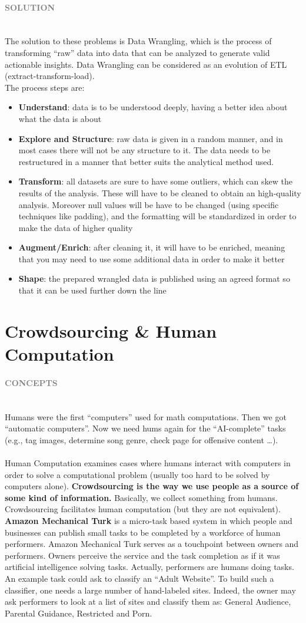 \documentclass[10pt,a4paper]{article}
\newcommand{\nline}{\\~\\}
\newcommand{\myparagraph}[1]{\paragraph{\normalsize{\textcolor{gray}{\uppercase{\textbf{#1}}}} }\mbox{} \vspace{0.5em}\\}
\begin{document}
\myparagraph{Solution}
The solution to these problems is Data Wrangling, which is the process of transforming “raw” data into data that can be analyzed to generate valid actionable insights. Data Wrangling can be considered as an evolution of ETL (extract-transform-load). \\ 
The process steps are:
\begin{itemize}
	\item \textbf{Understand}: data is to be understood deeply, having a better idea about what the data is about
	\item \textbf{Explore and Structure}: raw data is given in a random manner, and in most cases there will not be any structure to it. The data needs to be restructured in a manner that better suits the analytical method used.
	\item \textbf{Transform}: all datasets are sure to have some outliers, which can skew the results of the analysis. These will have to be cleaned to obtain an high-quality analysis. Moreover null values will be have to be changed (using specific techniques like padding), and the formatting will be standardized in order to make the data of higher quality
	\item \textbf{Augment/Enrich}:  after cleaning it, it will have to be enriched, meaning that you may need to use some additional data in order to make it better
	\item \textbf{Shape}: the prepared wrangled data is published using an agreed format so that it can be used further down the line
\end{itemize}

\section{Crowdsourcing \& Human Computation}
\myparagraph{Concepts}
Humans were the first “computers” used for math computations. Then we got “automatic computers”. Now we need hums again for the “AI-complete” tasks (e.g., tag images, determine song genre, check page for offensive content …).
\nline
Human Computation examines cases where humans interact with computers in order to solve a computational problem (usually too hard to be solved by computers alone). \textbf{Crowdsourcing is the way we use people as a source of some kind of information.} Basically, we collect something from humans. Crowdsourcing facilitates human computation (but they are not equivalent). \\
\textbf{Amazon Mechanical Turk} is a micro-task based system in which people and businesses can publish small tasks to be completed by a workforce of human performers. Amazon Mechanical Turk serves as a touchpoint between owners and performers. Owners perceive the service and the task completion as if it was artificial intelligence solving tasks. Actually, performers are humans doing tasks. \\
An example task could ask to classify an “Adult Website”. To build such a classifier, one needs a large number of hand-labeled sites. Indeed, the owner may ask performers to look at a list of sites and classify them as: General Audience, Parental Guidance, Restricted and Porn.
\end{document}

